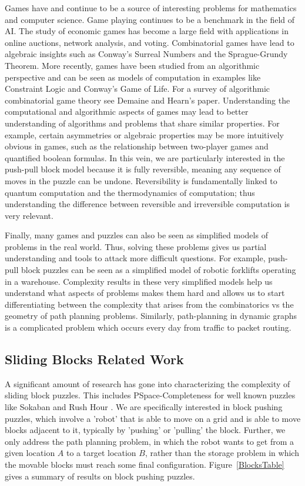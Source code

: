 \documentclass[11pt]{article}
\begin{document}
Games have and continue to be a source of interesting problems for mathematics and computer science. Game playing continues to be a benchmark in the field of AI. The study of economic games has become a large field with applications in online auctions\cite{auctions}, network analysis\cite{Internet}, and voting\cite{colman2013game}. Combinatorial games have lead to algebraic insights such as Conway's Surreal Numbers\cite{Surreal01} and the Sprague-Grundy Theorem\cite{Sprague35}\cite{Grundy39}. More recently, games have been studied from an algorithmic perspective and can be seen as models of computation in examples like Constraint Logic \cite{GPCBook09} and Conway's Game of Life\cite{LifeTuring01}. For a survey of algorithmic combinatorial game theory see Demaine and Hearn's paper\cite{AlgGameTheory_GONC3}. Understanding the computational and algorithmic aspects of games may lead to better understanding of algorithms and problems that share similar properties. For example, certain asymmetries or algebraic properties may be more intuitively obvious in games, such as the relationship between two-player games and quantified boolean formulas\cite{}. In this vein, we are particularly interested in the push-pull block model because it is fully reversible, meaning any sequence of moves in the puzzle can be undone. Reversibility is fundamentally linked to quantum computation and the thermodynamics of computation; thus understanding the difference between reversible and irreversible computation is very relevant. 

Finally, many games and puzzles can also be seen as simplified models of problems in the real world. Thus, solving these problems gives us partial understanding and tools to attack more difficult questions. For example, push-pull block puzzles can be seen as a simplified model of robotic forklifts operating in a warehouse. Complexity results in these very simplified models help us understand what aspects of problems makes them hard and allows us to start differentiating between the complexity that arises from the combinatorics vs the geometry of path planning problems. Similarly, path-planning in dynamic graphs is a complicated problem which occurs every day from traffic to packet routing.




\subsection{Sliding Blocks Related Work}

A significant amount of research has gone into characterizing the complexity of sliding block puzzles. This includes PSpace-Completeness for well known puzzles like Sokaban \cite{Sokoban98} and Rush Hour \cite{RushHour02}. We are specifically interested in block pushing puzzles, which involve a 'robot' that is able to move on a grid and is able to move blocks adjacent to it, typically by 'pushing' or 'pulling' the block. Further, we only address the path planning problem, in which the robot wants to get from a given location $A$ to a target location $B$, rather than the storage problem in which the movable blocks must reach some final configuration. Figure~\ref{BlocksTable} gives a summary of results on block pushing puzzles. 
\end{document}
